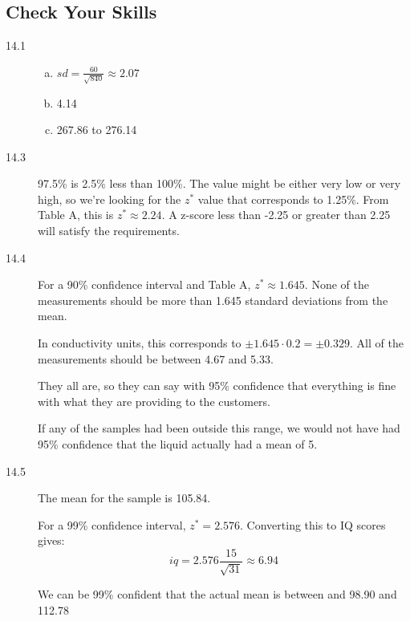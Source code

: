 \documentclass[landscape]{exam}
\begin{document}
  \subsection{Check Your Skills}
  \begin{description}
    \item[14.1] 
      \begin{enumerate}[(a)]

        \item $ sd = \frac{60}{\sqrt{840}} \approx 2.07$

        \item 4.14

        \item 267.86 to 276.14

      \end{enumerate}

    \item[14.3] 97.5\% is 2.5\% less than 100\%. The value might be either very low
      or very high, so we're looking for the $z^*$ value that corresponds to
      1.25\%. From Table A, this is $z^* \approx 2.24$. A z-score less than
      -2.25 or greater than 2.25 will satisfy the requirements.

    \item[14.4]
      For a 90\% confidence interval and Table A, $z^* \approx 1.645$. None of
      the measurements should be more than 1.645 standard deviations from the
      mean.

      In conductivity units, this corresponds to $\pm 1.645 \cdot 0.2 = \pm
      0.329$. All of the measurements should be between 4.67 and 5.33.

      They all are, so they can say with 95\% confidence that everything is
      fine with what they are providing to the customers.

      If any of the samples had been outside this range, we would not have had
      95\% confidence that the liquid actually had a mean of 5.

    \item[14.5]
      The mean for the sample is 105.84. 

      For a 99\% confidence interval, $z^* = 2.576$. Converting this to IQ
      scores gives:
      \[
        iq = 2.576 \frac{15}{\sqrt{31}} \approx 6.94
      \]

      We can be 99\% confident that the actual mean is between and 98.90 and 112.78

    \end{description}
\end{document}
